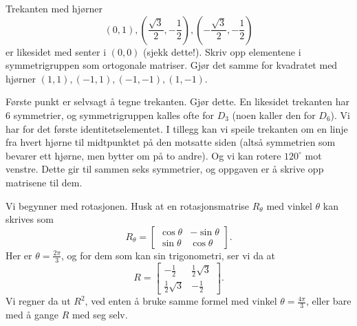 \documentclass[11pt, norsk]{article}
\begin{document}
\begin{oppg}
  Trekanten med hjørner 
\[
(0,1), \left( \frac{\sqrt 3}2 , -\frac 12 \right), \left( - \frac{\sqrt 3}2, -\frac 12 \right)
\]
er likesidet med senter i $(0,0)$ (sjekk dette!). Skriv opp elementene i symmetrigruppen som ortogonale matriser. Gjør det samme for kvadratet med hjørner $(1,1),(-1,1),(-1,-1),(1,-1)$. 
\end{oppg}
\begin{losn}
Første punkt er selvsagt å tegne trekanten. Gjør dette. En likesidet trekanten har $6$ symmetrier, og symmetrigruppen kalles ofte for $D_3$ (noen kaller den for $D_6$). Vi har for det første identitetselementet. I tillegg kan vi speile trekanten om en linje fra hvert hjørne til midtpunktet på den motsatte siden (altså symmetrien som bevarer ett hjørne, men bytter om på to andre). Og vi kan rotere $120^\circ$ mot venstre. Dette gir til sammen seks symmetrier, og oppgaven er å skrive opp matrisene til dem.

Vi begynner med rotasjonen. Husk at en rotasjonsmatrise $R_\theta$ med vinkel $\theta$ kan skrives som 
\[
R_\theta = \begin{bmatrix}
\cos \theta & -\sin \theta \\
\sin \theta & \cos \theta
\end{bmatrix}.
\]
Her er $\theta = \frac{2 \pi}{3}$, og for dem som kan sin trigonometri, ser vi da at
\[
R = \begin{bmatrix}
-\frac 12 & \frac 12 \sqrt 3 \\
\frac 12 \sqrt 3  & - \frac 12
\end{bmatrix}.
\]
Vi regner da ut $R^2$, ved enten å bruke samme formel med vinkel $\theta = \frac{4\pi}{3}$, eller bare med å gange $R$ med seg selv.


\end{losn}
\end{document}
